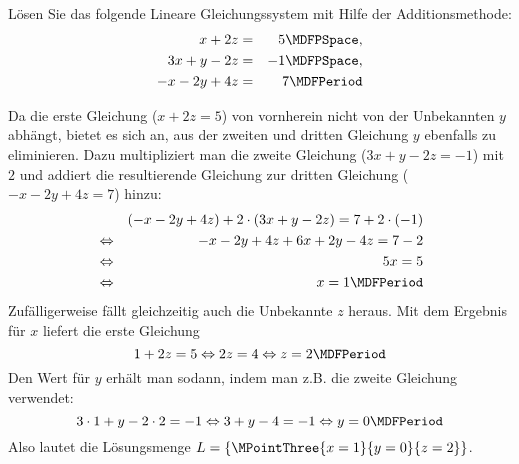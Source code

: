 \begin{MExercises}
\begin{MExercise}
Lösen Sie das folgende Lineare Gleichungssystem mit Hilfe der Additionsmethode:
\begin{eqnarray*}
x + 2 z & = & 5 \MDFPSpace, \\ 3 x + y - 2 z & = & - 1  \MDFPSpace,\\ - x - 2 y + 4 z & = & 7 \MDFPeriod
\end{eqnarray*}

\begin{MHint}{\iSolution}
Da die erste Gleichung ($x + 2 z = 5$) von vornherein nicht von der Unbekannten $y$ abhängt, bietet es sich
an, aus der zweiten und dritten Gleichung $y$ ebenfalls zu eliminieren. Dazu multipliziert man die zweite
Gleichung ($3 x + y - 2 z = - 1$) mit $2$ und addiert die resultierende Gleichung zur dritten Gleichung
($- x - 2 y + 4 z = 7$) hinzu:
\begin{eqnarray*}
& & (- x - 2 y + 4 z) + 2 \cdot (3 x + y - 2 z) = 7 + 2 \cdot (- 1) \\
& \Leftrightarrow & - x - 2 y + 4 z + 6 x + 2 y - 4 z = 7 - 2 \\
& \Leftrightarrow & 5 x = 5 \\
& \Leftrightarrow & x = 1 \MDFPeriod
\end{eqnarray*}
Zufälligerweise fällt gleichzeitig auch die Unbekannte $z$ heraus.
Mit dem Ergebnis für $x$ liefert die erste Gleichung
$$1 + 2 z = 5 \Leftrightarrow 2 z = 4 \Leftrightarrow z = 2 \MDFPeriod$$
Den Wert für $y$ erhält man sodann, indem man z.B. die zweite Gleichung verwendet:
$$3 \cdot 1 + y - 2 \cdot 2 = - 1 \Leftrightarrow 3 + y - 4 = - 1 \Leftrightarrow y = 0 \MDFPeriod$$
Also lautet die Lösungsmenge ${\ML} = \{ \MPointThree{x = 1}{y = 0}{z = 2} \}$.
\end{MHint}
\end{MExercise}
\end{MExercises}




